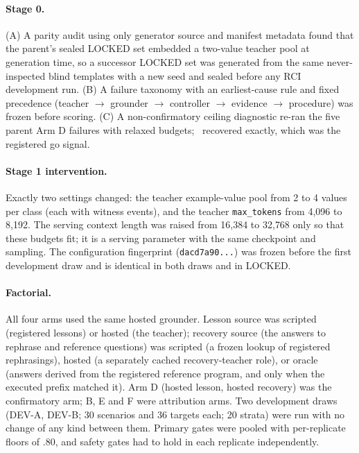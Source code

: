 \documentclass[10pt]{article}
\newcommand{\id}[1]{\nolinkurl{#1}}
\begin{document}
\paragraph{Stage 0.} (A) A parity audit using only generator source and manifest metadata found that the parent's sealed LOCKED set embedded a two-value teacher pool at generation time, so a successor LOCKED set was generated from the same never-inspected blind templates with a new seed and sealed before any RCI development run. (B) A failure taxonomy with an earliest-cause rule and fixed precedence (teacher $\rightarrow$ grounder $\rightarrow$ controller $\rightarrow$ evidence $\rightarrow$ procedure) was frozen before scoring. (C) A non-confirmatory ceiling diagnostic re-ran the five parent Arm D failures with relaxed budgets; \rciCeiling\ recovered exactly, which was the registered go signal.

\paragraph{Stage 1 intervention.} Exactly two settings changed: the teacher example-value pool from 2 to 4 values per class (each with witness events), and the teacher \id{max_tokens} from 4{,}096 to 8{,}192. The serving context length was raised from 16{,}384 to 32{,}768 only so that these budgets fit; it is a serving parameter with the same checkpoint and sampling. The configuration fingerprint (\id{dacd7a90...}) was frozen before the first development draw and is identical in both draws and in LOCKED.

\paragraph{Factorial.} All four arms used the same hosted grounder. Lesson source was scripted (registered lessons) or hosted (the teacher); recovery source (the answers to rephrase and reference questions) was scripted (a frozen lookup of registered rephrasings), hosted (a separately cached recovery-teacher role), or oracle (answers derived from the registered reference program, and only when the executed prefix matched it). Arm D (hosted lesson, hosted recovery) was the confirmatory arm; B, E and F were attribution arms. Two development draws (DEV-A, DEV-B; 30 scenarios and 36 targets each; 20 strata) were run with no change of any kind between them. Primary gates were pooled with per-replicate floors of .80, and safety gates had to hold in each replicate independently.
\end{document}
